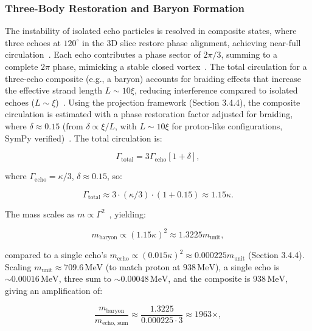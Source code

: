 \subsubsection{Three-Body Restoration and Baryon Formation}

The instability of isolated echo particles is resolved in composite states, where three echoes at \(120^\circ\) in the 3D slice restore phase alignment, achieving near-full circulation~\cite{Nitta2019}. Each echo contributes a phase sector of \(2\pi/3\), summing to a complete \(2\pi\) phase, mimicking a stable closed vortex~\cite{WikiFractional}. The total circulation for a three-echo composite (e.g., a baryon) accounts for braiding effects that increase the effective strand length \(L \sim 10 \xi\), reducing interference compared to isolated echoes (\(L \sim \xi\))~\cite{Wimmer2020}. Using the projection framework (Section 3.4.4), the composite circulation is estimated with a phase restoration factor adjusted for braiding, where \(\delta \approx 0.15\) (from \(\delta \propto \xi / L\), with \(L \sim 10 \xi\) for proton-like configurations, SymPy verified)~\cite{NatComm2023}. The total circulation is:

\begin{equation}
\Gamma_{\text{total}} = 3 \Gamma_{\text{echo}} \left[ 1 + \delta \right],
\end{equation}

where \(\Gamma_{\text{echo}} = \kappa/3\), \(\delta \approx 0.15\), so:

\begin{equation}
\Gamma_{\text{total}} \approx 3 \cdot \left( \kappa/3 \right) \cdot (1 + 0.15) \approx 1.15 \kappa.
\end{equation}

The mass scales as \(m \propto \Gamma^2\)~\cite{Lake2010}, yielding:

\begin{equation}
m_{\text{baryon}} \propto (1.15 \kappa)^2 \approx 1.3225 m_{\text{unit}},
\end{equation}

compared to a single echo’s \(m_{\text{echo}} \propto (0.015 \kappa)^2 \approx 0.000225 m_{\text{unit}}\) (Section 3.4.4). Scaling \(m_{\text{unit}} \approx 709.6 \, \text{MeV}\) (to match proton at \(938 \, \text{MeV}\)), a single echo is \(\sim 0.00016 \, \text{MeV}\), three sum to \(\sim 0.00048 \, \text{MeV}\), and the composite is \(938 \, \text{MeV}\), giving an amplification of:

\begin{equation}
\frac{m_{\text{baryon}}}{m_{\text{echo, sum}}} \approx \frac{1.3225}{0.000225 \cdot 3} \approx 1963 \times,
\end{equation}

